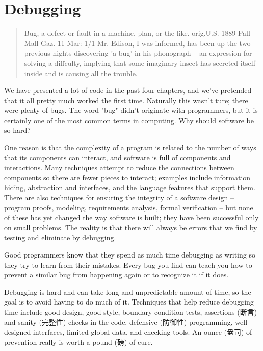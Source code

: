 \chapter{Debugging}
\label{chap:debug}
\begin{quote}
    Bug, a defect or fault in a machine, plan, or the like. orig.U.S. 1889
    Pall Mall Gaz. 11 Mar: 1/1 Mr. Edison, I was informed, has been up the
    two previous nights discovering 'a bug' in his phonograph -- an
    expression for solving a diffculty, implying that some imaginary insect
    has secreted itself inside and is causing all the trouble.
\end{quote}

\begin{quotesrc}
\end{quotesrc}

We have presented a lot of code in the past four chapters, and we've
pretended that it all pretty much worked the first time. Naturally this
wasn't ture; there were plenty of bugs. The word "bug" didn't originate
with programmers, but it is certainly one of the most common terms in
computing. Why should software be so hard?

One reason is that the complexity of a program is related to the number of
ways that its components can interact, and software is full of components
and interactions. Many techniques attempt to reduce the connections between
components so there are fewer pieces to interact; examples include
information hiding, abstraction and interfaces, and the language features
that support them. There are also techniques for ensuring the integrity of
a software design -- program proofs, modeling, requirements analysis,
formal verification -- but none of these has yet changed the way software
is built; they have been successful only on small problems. The reality is
that there will always be errors that we find by testing and eliminate by
debugging.

Good programmers know that they spend as much time debugging as writing so
they try to learn from their mistakes. Every bug you find can teach you how
to prevent a similar bug from happening again or to recognize it if it
does.

Debugging is hard and can take long and unpredictable amount of time, so
the goal is to avoid having to do much of it. Techniques that help reduce
debugging time include good design, good style, boundary condition tests,
assertions (断言) and sanity (完整性) checks in the code, defensive
(防御性) programming, well-designed interfaces, limited global data, and
checking tools. An ounce (盎司) of prevention really is worth a pound (磅)
of cure.

